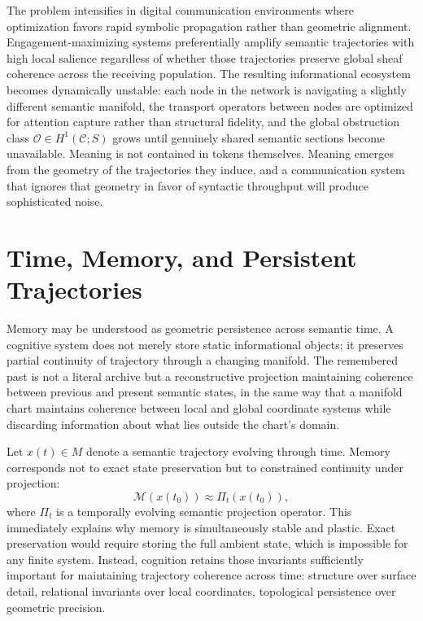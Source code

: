 \documentclass[11pt,a4paper,twocolumn]{article}
\begin{document}
The problem intensifies in digital communication environments
where optimization favors rapid symbolic propagation rather
than geometric alignment. Engagement-maximizing systems
preferentially amplify semantic trajectories with high local
salience regardless of whether those trajectories preserve
global sheaf coherence across the receiving population.
The resulting informational ecosystem becomes dynamically
unstable: each node in the network is navigating a slightly
different semantic manifold, the transport operators between
nodes are optimized for attention capture rather than
structural fidelity, and the global obstruction class
$\mathcal{O} \in H^1(\mathcal{C}; S)$ grows until
genuinely shared semantic sections become unavailable.
Meaning is not contained in tokens themselves. Meaning
emerges from the geometry of the trajectories they induce,
and a communication system that ignores that geometry in
favor of syntactic throughput will produce sophisticated
noise.


\section{Time, Memory, and Persistent Trajectories}

Memory may be understood as geometric persistence across
semantic time. A cognitive system does not merely store
static informational objects; it preserves partial
continuity of trajectory through a changing manifold. The
remembered past is not a literal archive but a reconstructive
projection maintaining coherence between previous and present
semantic states, in the same way that a manifold chart
maintains coherence between local and global coordinate
systems while discarding information about what lies outside
the chart's domain.

Let $x(t) \in M$ denote a semantic trajectory evolving
through time. Memory corresponds not to exact state
preservation but to constrained continuity under projection:
\[
\mathcal{M}(x(t_0))
\approx
\Pi_t(x(t_0)),
\]
where $\Pi_t$ is a temporally evolving semantic projection
operator. This immediately explains why memory is
simultaneously stable and plastic. Exact preservation would
require storing the full ambient state, which is impossible
for any finite system. Instead, cognition retains those
invariants sufficiently important for maintaining trajectory
coherence across time: structure over surface detail,
relational invariants over local coordinates, topological
persistence over geometric precision.
\end{document}
